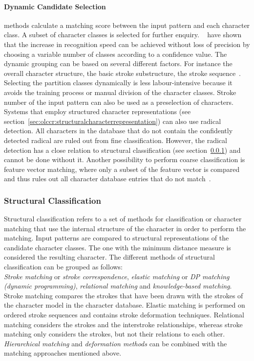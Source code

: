 \paragraph{Dynamic Candidate Selection} methods calculate a matching score between 
the input pattern and each character class. A subset of character classes is 
selected for further enquiry.
~\citeyear{LiuNakagawa2000} have shown that the 
increase in recognition speed can be achieved without loss of precision by 
choosing a variable number of classes according to a confidence value.
The dynamic grouping can be based on several different factors. For instance
the overall character structure, the basic stroke substructure, the stroke 
sequence~.
Selecting the partition classes dynamically is less labour-intensive because it
avoids the training process or manual division of the character classes.
Stroke number of the input pattern can also be used as a preselection of
characters. Systems that employ structured character representations (see 
section~\ref{sec:olccr:structuralcharacterrepresentation}) can also use radical 
detection. All characters in the database that do not contain the confidently 
detected radical are ruled out from fine classification. However, the radical
detection has a close relation to structural classification (see 
section~\ref{sec:olccr:structuralclassification}) and cannot be done without it.
Another possibility to perform coarse classification is feature vector matching,
where only a subset of the feature vector is compared and thus rules out all
character database entries that do not match~.

\subsubsection{Structural Classification}
\label{sec:olccr:structuralclassification}

Structural classification refers to a set of methods for classification or
character matching that use the internal structure of the character in order to
perform the matching. Input patterns are compared to structural representations
of the candidate character classes.
The one with the minimum distance measure is considered the resulting character.
The different methods of structural classification can be grouped as follows:\\
\emph{Stroke matching} or \emph{stroke correspondence}, 
\emph{elastic matching} or \emph{DP matching (dynamic programming)}, 
\emph{relational matching} and \emph{knowledge-based matching}.
Stroke matching compares the strokes that have been drawn with the strokes of the
character model in the character database. Elastic matching is performed on 
ordered stroke sequences and contains stroke deformation techniques. 
Relational matching considers the strokes and the interstroke relationships, 
whereas stroke matching only considers the strokes, but not their relations 
to each other. \emph{Hierarchical matching} and \emph{deformation methods} can
be combined with the matching approaches mentioned above.


